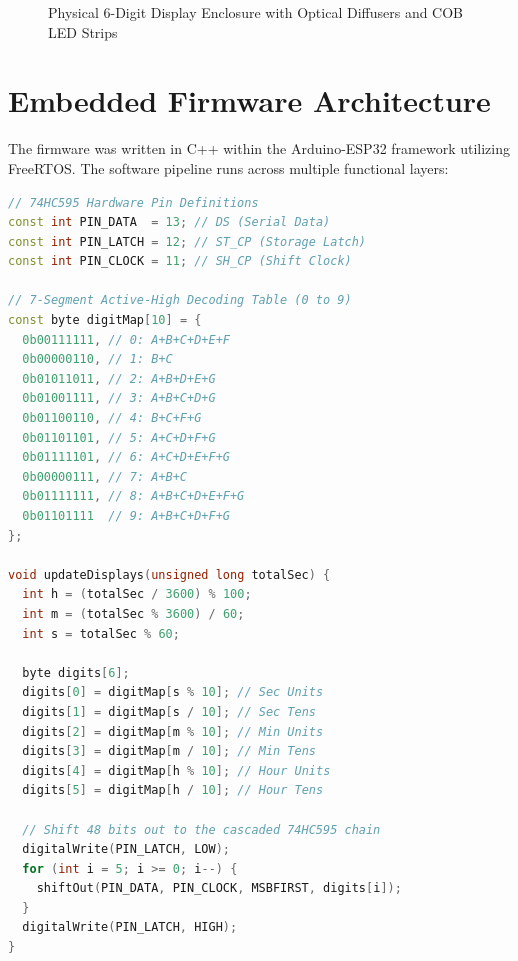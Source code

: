 \documentclass[12pt,a4paper,oneside]{report}
\begin{document}
\begin{figure}[H]
\centering
{}
\caption{Physical 6-Digit Display Enclosure with Optical Diffusers and COB LED Strips}
\label{fig:real_display}
\end{figure}



\section{Embedded Firmware Architecture}
The firmware was written in C++ within the Arduino-ESP32 framework utilizing FreeRTOS. The software pipeline runs across multiple functional layers:

\begin{lstlisting}[language=C++, caption={ESP32 ShiftOut SPI Driver for 6 Cascaded 74HC595 Registers}, label={lst:shiftout}]
// 74HC595 Hardware Pin Definitions
const int PIN_DATA  = 13; // DS (Serial Data)
const int PIN_LATCH = 12; // ST_CP (Storage Latch)
const int PIN_CLOCK = 11; // SH_CP (Shift Clock)

// 7-Segment Active-High Decoding Table (0 to 9)
const byte digitMap[10] = {
  0b00111111, // 0: A+B+C+D+E+F
  0b00000110, // 1: B+C
  0b01011011, // 2: A+B+D+E+G
  0b01001111, // 3: A+B+C+D+G
  0b01100110, // 4: B+C+F+G
  0b01101101, // 5: A+C+D+F+G
  0b01111101, // 6: A+C+D+E+F+G
  0b00000111, // 7: A+B+C
  0b01111111, // 8: A+B+C+D+E+F+G
  0b01101111  // 9: A+B+C+D+F+G
};

void updateDisplays(unsigned long totalSec) {
  int h = (totalSec / 3600) % 100;
  int m = (totalSec % 3600) / 60;
  int s = totalSec % 60;

  byte digits[6];
  digits[0] = digitMap[s % 10]; // Sec Units
  digits[1] = digitMap[s / 10]; // Sec Tens
  digits[2] = digitMap[m % 10]; // Min Units
  digits[3] = digitMap[m / 10]; // Min Tens
  digits[4] = digitMap[h % 10]; // Hour Units
  digits[5] = digitMap[h / 10]; // Hour Tens

  // Shift 48 bits out to the cascaded 74HC595 chain
  digitalWrite(PIN_LATCH, LOW);
  for (int i = 5; i >= 0; i--) {
    shiftOut(PIN_DATA, PIN_CLOCK, MSBFIRST, digits[i]);
  }
  digitalWrite(PIN_LATCH, HIGH);
}
\end{lstlisting}
\end{document}
